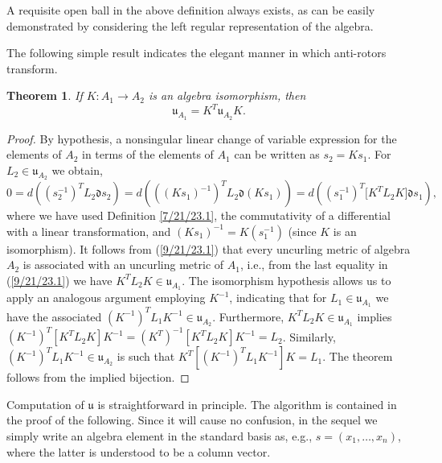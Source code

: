 \documentclass{amsart}
\numberwithin{equation}{section}
\newtheorem{theorem}{Theorem}
\theoremstyle{definition}
\numberwithin{theorem}{section}
\begin{document}
   
     A requisite open ball in the above definition always exists, as can be easily demonstrated by considering the left regular representation of the algebra. 

The following simple result indicates the elegant manner in which anti-rotors transform.

\begin{theorem} \label{6/6/23.1} If $K:A_1\rightarrow A_2$ is an algebra isomorphism, then \begin{equation}\label{5/23/23.1} \mathfrak{u}_{A_1} = K^T \mathfrak{u}_{A_2} K. \end{equation} \end{theorem}

\begin{proof} By hypothesis, a nonsingular linear change of variable expression for the elements of $A_2$ in terms of the elements of $A_1$ can be written as $s_2= Ks_1$. \mbox{For $L_2\in \mathfrak{u}_{A_2}$} we obtain, \begin{equation} 0 = d\left((s_2^{-1})^T L_2 \mathfrak{d}s_2\right) =  d\left(((Ks_1)^{-1})^T L_2 \mathfrak{d}(Ks_1)\right) = d\left((s_1^{-1})^T \big[K^T L_2K\big]\mathfrak{d}s_1\right), \label{9/21/23.1}  \end{equation} where we have used Definition \ref{7/21/23.1}, the commutativity of a differential with a linear transformation, and $(Ks_1)^{-1} = K(s_1^{-1})$ (since $K$ is an isomorphism).   It follows from (\ref{9/21/23.1}) that every uncurling metric  of algebra $A_2$ is associated with an uncurling metric of $A_1$, i.e., from the last equality in (\ref{9/21/23.1}) we have  $K^TL_2K\in\mathfrak{u}_{A_1}$.  The isomorphism hypothesis allows us to apply an analogous argument employing $K^{-1}$, indicating that for $L_1\in\mathfrak{u}_{A_1}$ we have the associated $(K^{-1})^T L_1 K^{-1} \in \mathfrak{u}_{A_2}$.    Furthermore, $K^T L_2K\in\mathfrak{u}_{A_1}$ implies $(K^{-1})^T [K^T L_2 K]K^{-1} = (K^T)^{-1} [K^T L_2 K]K^{-1} = L_2$.  Similarly, $(K^{-1})^T L_1K^{-1}\in\mathfrak{u}_{A_2}$ is such that $K^T[(K^{-1})^T L_1K^{-1}] K = L_1$.  The theorem follows from the implied bijection. 
\end{proof}

Computation of $\mathfrak{u}$ is straightforward in principle.  The algorithm is contained in the proof of the following.  Since it will cause no confusion, in the sequel we simply write an algebra element in the standard basis as, e.g., $s=(x_1,\dots,x_n)$, where the latter is understood to be a column vector.
\end{document}
